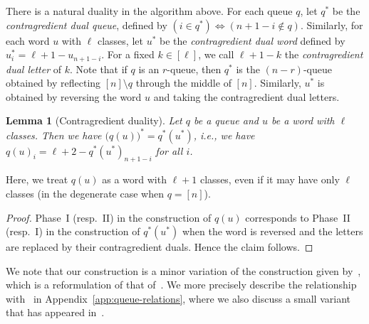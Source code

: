 \documentclass[reqno]{amsart}
\newcommand{\0}{\phantom{c}}
\DeclareMathOperator{\inter}{int} %
\newcommand{\tup}[1]{\left( #1 \right)}
\newcommand{\ive}[1]{\left[ #1 \right]}
\newcommand{\defn}[1]{{\color{darkred}\emph{#1}}} %
\theoremstyle{plain}
\newtheorem{lemma}[thm]{Lemma}
\theoremstyle{definition}
\newtheorem{remark}[thm]{Remark}
\numberwithin{equation}{section}
\begin{document}
There is a natural duality in the algorithm above.
For each queue $q$, let $q^*$ be the \defn{contragredient dual queue}, defined by $\tup{i \in q^*} \Longleftrightarrow \tup{n+1-i \notin q}$.
Similarly, for each word $u$ with $\ell$ classes, let $u^*$ be the \defn{contragredient dual word} defined by $u^*_i = \ell + 1 - u_{n+1-i}$.
For a fixed $k \in \ive{\ell}$, we call $\ell + 1 - k$ the \defn{contragredient dual letter} of $k$.
Note that if $q$ is an $r$-queue, then $q^*$ is the $(n-r)$-queue obtained by reflecting $[n] \setminus q$ through the middle of $[n]$.
Similarly, $u^*$ is obtained by reversing the word $u$ and taking the contragredient dual letters.

\begin{lemma}[Contragredient duality]
  \label{le:dual}
  Let $q$ be a queue and $u$ be a word with $\ell$ classes.
  Then we have $\bigl(q(u) \bigr)^* = q^*(u^*)$, \textit{i.e.}, we have $q(u)_i = \ell + 2 - q^*(u^*)_{n+1-i}$ for all $i$.
\end{lemma}

Here, we treat $q(u)$ as a word with $\ell+1$ classes, even if it may have only $\ell$ classes (in the degenerate case when $q = \ive{n}$).

\begin{proof}
Phase~I (resp.~II) in the construction of $q(u)$ corresponds to Phase~II (resp.~I) in the construction of $q^*(u^*)$ when the word is reversed and the letters are replaced by their contragredient duals.
Hence the claim follows.
\end{proof}


We note that our construction is a minor variation of the construction given by~\cite[\S 3.1]{AAMP}, which is a reformulation of that of~\cite{FM07}.
We more precisely describe the relationship with~\cite{FM07} in Appendix~\ref{app:queue-relations}, where we also discuss a small variant that has appeared in~\cite{AssSea18}.
\end{document}
